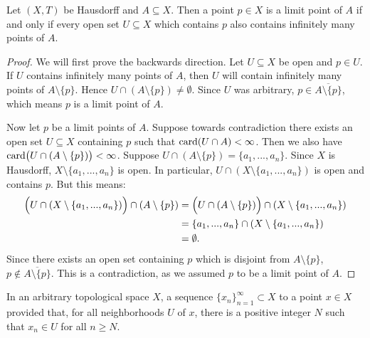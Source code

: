 \begin{proposition}
    Let $(X,T)$ be Hausdorff and $A \subseteq X$. Then a point $p \in X$ is a limit point of $A$ if and only if every open set $U \subseteq X$ which contains $p$ also contains infinitely many points of $A$.
\end{proposition}
    \begin{proof}
        We will first prove the backwards direction. Let $U \subseteq X$ be open and $p \in U$. If $U$ contains infinitely many points of $A$, then $U$ will contain infinitely many points of $A \setminus \{p\}$. Hence $U \cap (A \setminus \{p\}) \neq \emptyset$. Since $U$ was arbitrary, $p \in \overline{A \setminus \{p\}}$, which means $p$ is a limit point of $A$.

        Now let $p$ be a limit points of $A$. Suppose towards contradiction there exists an open set $U \subseteq X$ containing $p$ such that $\operatorname{card}(U \cap A) < \infty$. Then we also have $\operatorname{card}\bigl(U \cap (A \setminus \{p\})\bigr) < \infty$. Suppose $U \cap (A \setminus \{p\}) = \{a_1,...,a_n\}$. Since $X$ is Hausdorff, $X \setminus \{a_1,...,a_n\}$ is open. In particular, $U \cap (X \setminus \{a_1,...,a_n\})$ is open and contains $p$. But this means:
            \begin{equation*}
            \begin{split}
                \Bigl(U \cap (X \setminus\{a_1,...,a_n\})\Bigr) \cap (A \setminus \{p\}) 
                & = \Bigl(U \cap (A \setminus \{p\})\Bigr) \cap (X \setminus\{a_1,...,a_n\}) \\
                & = \{a_1,...,a_n\} \cap (X \setminus\{a_1,...,a_n\}) \\
                & = \emptyset.
            \end{split}
            \end{equation*}
        Since there exists an open set containing $p$ which is disjoint from $A \setminus \{p\}$, $p \not\in \overline{A \setminus \{p\}}$. This is a contradiction, as we assumed $p$ to be a limit point of $A$.
    \end{proof}

\begin{definition}
    In an arbitrary topological space $X$, a sequence $\{x_n\}_{n = 1}^\infty \subset X$  to a point $x \in X$ provided that, for all neighborhoods $U$ of $x$, there is a positive integer $N$ such that $x_n \in U$ for all $n \geq N$.
\end{definition}

